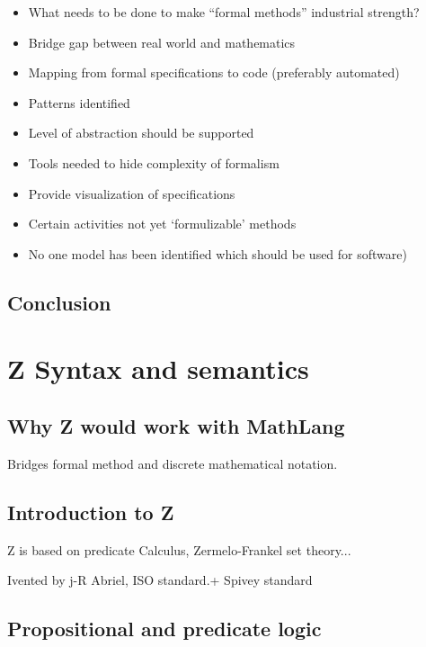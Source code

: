 \begin{itemize}
\begin{itemize}
\item What needs to be done to make “formal methods” industrial strength? 
\end{itemize}
\begin{itemize}
\item Bridge gap between real world and mathematics
\item Mapping from formal specifications to code (preferably automated)
\item Patterns identified
\item Level of abstraction should be supported
\item Tools needed to hide complexity of formalism
\item Provide visualization of specifications 
\item Certain activities not yet ‘formulizable’ methods
\item No one model has been identified which should be used for software)
\end{itemize}
\end{itemize}

\subsection{Conclusion}

\section{Z Syntax and semantics}
\label{sec:theznotation}

\subsection{Why Z would work with MathLang}

Bridges formal method and discrete mathematical notation.

\subsection{Introduction to Z}

Z is based on predicate Calculus, Zermelo-Frankel set theory...

Ivented by j-R Abriel, ISO standard.+ Spivey standard

\subsection{Propositional and predicate logic}

